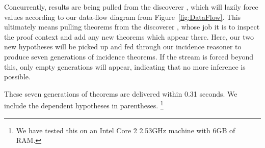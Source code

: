 Concurrently, results are being pulled from the discoverer , which will lazily force values according to our data-flow diagram from Figure~\ref{fig:DataFlow}. This ultimately means pulling theorems from the discoverer , whose job it is to inspect the proof context and add any new theorems which appear there. Here, our two new hypotheses will be picked up and fed through our incidence reasoner to produce seven generations of incidence theorems. If the stream is forced beyond this, only empty generations will appear, indicating that no more inference is possible.

These seven generations of theorems are delivered within 0.31 seconds. We include the dependent hypotheses in parentheses. \footnote{We have tested this on an Intel Core 2 2.53GHz machine with 6GB of RAM.}

